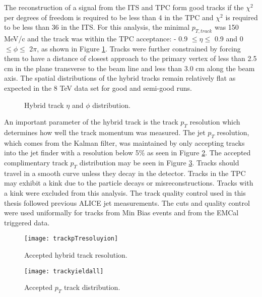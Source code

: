 The reconstruction of a signal from the ITS and TPC form good tracks if the $\chi^{2}$ per degrees of freedom is required to be less than 4 in the TPC and $\chi^{2}$ is required to be less than 36 in the ITS. For this analysis, the minimal $p_{T, track}$ was 150 MeV/c and the track was within the TPC acceptance: - 0.9 $\leq \eta \leq$ 0.9 and 0 $\leq \phi \leq$ 2$\pi$, as shown in Figure \ref{fig:Hybridtracketaphi}. Tracks were further constrained by forcing them to have a distance of closest approach to the primary vertex of less than 2.5 cm in the plane transverse to the beam line and less than 3.0 cm along the beam axis.  The spatial distributions of the hybrid tracks remain relatively flat as expected in the 8 TeV data set for good and semi-good runs.

\begin{figure}%
    \centering
    \qquad
    \caption{Hybrid track $\eta$ and $\phi$ distribution.}%
    \label{fig:Hybridtracketaphi}%
\end{figure}




An important parameter of the hybrid track is the track $p_{T}$ resolution which determines how well the track momentum was measured.  The jet $p_{T}$ resolution, which comes from the Kalman filter, was maintained by only accepting tracks into the jet finder with a resolution below 5\% as seen in Figure \ref{fig:trackresolution}.  The accepted complimentary track $p_{T}$ distribution may be seen in Figure \ref{fig:hybtrackpt}.  Tracks should travel in a smooth curve unless they decay in the detector.  Tracks in the TPC may exhibit a kink due to the particle decays or misreconstructions.  Tracks with a kink were excluded from this analysis.  The track quality control used in this thesis followed previous ALICE jet measurements\cite{Acharya:2018eat}.  The cuts and quality control were used uniformally for tracks from Min Bias events and from the EMCal triggered data.

\begin{figure}
\texttt{[image: trackpTresoluyion]}
\centering
\caption{Accepted hybrid track resolution.}
\label{fig:trackresolution}
\end{figure}

\begin{figure}
\texttt{[image: trackyieldall]}
\centering
\caption{Accepted $p_{T}$ track distribution.}
\label{fig:hybtrackpt}
\end{figure}


